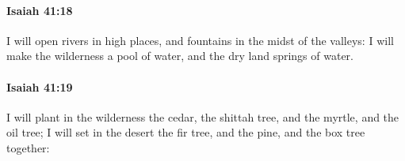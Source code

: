 		\paragraph{Isaiah 41:18} %
			\label{ISAIAH-41-18}

			I will open rivers in high places, and fountains in the midst of the valleys: I will make the wilderness a pool of water, and the dry land springs of water.


		\paragraph{Isaiah 41:19} %
			\label{ISAIAH-41-19}

			I will plant in the wilderness the cedar, the shittah tree, and the myrtle, and the oil tree; I will set in the desert the fir tree, and the pine, and the box tree together:


